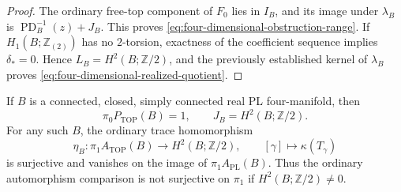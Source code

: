 \begin{proof}
The ordinary free-top component of $F_0$ lies in $I_B$, and its
image under $\lambda_B$ is
$\operatorname{PD}_B^{-1}(z)+J_B$. This proves
\eqref{eq:four-dimensional-obstruction-range}. If
$H_1(B;\mathbb Z_{(2)})$ has no $2$-torsion, exactness of the
coefficient sequence implies $\delta_*=0$. Hence
$L_B=H^2(B;\mathbb Z/2)$, and the previously established kernel
of $\lambda_B$ proves
\eqref{eq:four-dimensional-realized-quotient}.
\end{proof}

\begin{corollary}\label{cor:simply-connected-four-dimensional-trace}
If $B$ is a connected, closed, simply connected real PL
four-manifold, then
\[
              \pi_0P_{\mathrm{TOP}}(B)=1,
              \qquad J_B=H^2(B;\mathbb Z/2).
\]
For any such $B$, the ordinary trace homomorphism
\begin{equation}\label{eq:ordinary-four-dimensional-loop-obstruction}
 \eta_B:\pi_1A_{\mathrm{TOP}}(B)
       \longrightarrow H^2(B;\mathbb Z/2),
       \qquad [\gamma]\longmapsto\kappa(T_\gamma)
\end{equation}
is surjective and vanishes on the image of
$\pi_1A_{\mathrm{PL}}(B)$. Thus the ordinary automorphism
comparison is not surjective on $\pi_1$ if
$H^2(B;\mathbb Z/2)\ne0$.
\end{corollary}

